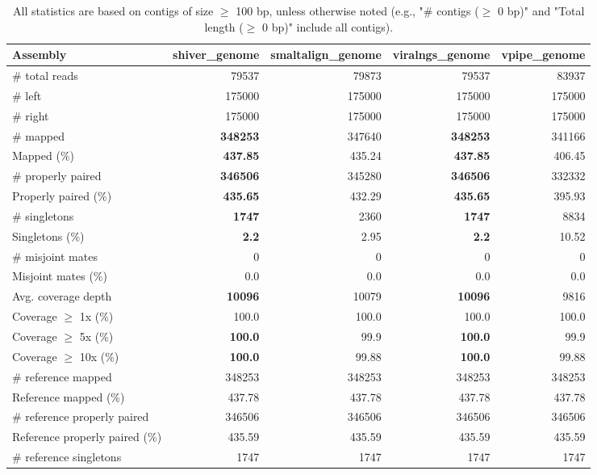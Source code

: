 \documentclass[12pt,a4paper]{article}
\begin{document}
\begin{table}[ht]
\begin{center}
\caption{All statistics are based on contigs of size $\geq$ 100 bp, unless otherwise noted (e.g., "\# contigs ($\geq$ 0 bp)" and "Total length ($\geq$ 0 bp)" include all contigs).}
\begin{tabular}{|l*{4}{|r}|}
\hline
Assembly & shiver\_genome & smaltalign\_genome & viralngs\_genome & vpipe\_genome \\ \hline
\# total reads & 79537 & 79873 & 79537 & 83937 \\ \hline
\# left & 175000 & 175000 & 175000 & 175000 \\ \hline
\# right & 175000 & 175000 & 175000 & 175000 \\ \hline
\# mapped & {\bf 348253} & 347640 & {\bf 348253} & 341166 \\ \hline
Mapped (\%) & {\bf 437.85} & 435.24 & {\bf 437.85} & 406.45 \\ \hline
\# properly paired & {\bf 346506} & 345280 & {\bf 346506} & 332332 \\ \hline
Properly paired (\%) & {\bf 435.65} & 432.29 & {\bf 435.65} & 395.93 \\ \hline
\# singletons & {\bf 1747} & 2360 & {\bf 1747} & 8834 \\ \hline
Singletons (\%) & {\bf 2.2} & 2.95 & {\bf 2.2} & 10.52 \\ \hline
\# misjoint mates & 0 & 0 & 0 & 0 \\ \hline
Misjoint mates (\%) & 0.0 & 0.0 & 0.0 & 0.0 \\ \hline
Avg. coverage depth & {\bf 10096} & 10079 & {\bf 10096} & 9816 \\ \hline
Coverage $\geq$ 1x (\%) & 100.0 & 100.0 & 100.0 & 100.0 \\ \hline
Coverage $\geq$ 5x (\%) & {\bf 100.0} & 99.9 & {\bf 100.0} & 99.9 \\ \hline
Coverage $\geq$ 10x (\%) & {\bf 100.0} & 99.88 & {\bf 100.0} & 99.88 \\ \hline
\# reference mapped & 348253 & 348253 & 348253 & 348253 \\ \hline
Reference mapped (\%) & 437.78 & 437.78 & 437.78 & 437.78 \\ \hline
\# reference properly paired & 346506 & 346506 & 346506 & 346506 \\ \hline
Reference properly paired (\%) & 435.59 & 435.59 & 435.59 & 435.59 \\ \hline
\# reference singletons & 1747 & 1747 & 1747 & 1747 \\ \hline

\end{tabular}
\end{center}
\end{table}
\end{document}
